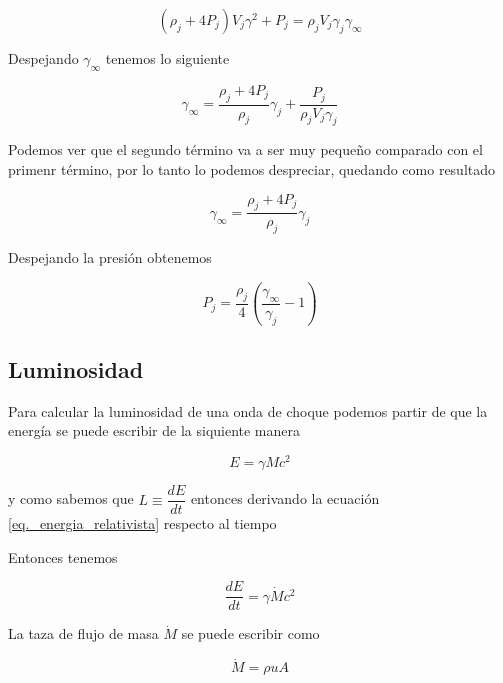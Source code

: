 \documentclass[12pt,a4paper]{book}
\begin{document}
\begin{equation} \label{eq_momentos_choque_fuerte}
  \left( \rho_j + 4P_j \right)V_j \gamma^2 +P_j = \rho_j V_j \gamma_j \gamma_\infty
\end{equation}

Despejando $\gamma_\infty$ tenemos lo siguiente

\begin{equation}
  \gamma_\infty = \frac{\rho_j +4P_j}{\rho_j} \gamma_j +\frac{P_j}{\rho_j V_j \gamma_j}
\end{equation}

Podemos ver que el segundo término va a ser muy pequeño comparado con el primenr término, por lo tanto lo podemos despreciar, quedando como resultado

\begin{equation}
  \gamma_\infty = \frac{\rho_j +4P_j}{\rho_j} \gamma_j 
\end{equation}

Despejando la presión obtenemos

\begin{equation}
  P_j = \frac{\rho_j}{4}\left( \frac{\gamma_\infty}{\gamma_j}-1\right)
\end{equation}


\subsection{Luminosidad}

Para calcular la luminosidad de una onda de choque podemos partir de que la energía se puede escribir de la siquiente manera

\begin{equation} \label{eq._energia_relativista}
  E = \gamma M c^2
\end{equation}

y como sabemos que $L \equiv \dfrac{d E}{d t}$ entonces derivando la ecuación \ref{eq._energia_relativista} respecto al tiempo

Entonces tenemos 

\begin{equation} \label{eq._luminosidad_relativista}
  \dfrac{d E}{d t} = \gamma \dot{ M }  c^2
\end{equation}

La taza de flujo de masa $\dot{M}$ se puede escribir como

\begin{equation}
  \dot{M} = \rho u A
\end{equation}
\end{document}
